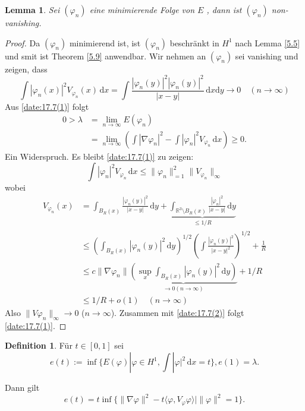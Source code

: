\documentclass[
paper=a4,
bibtotocnumbered,
liststotocnumbered,
tablecaptionabove,
pointlessnumbers,
twoside,
openright,
10pt
]
{report}
\let\phi\varphi
\newtheorem{lem}[thm]{Lemma}
\theoremstyle{definition}
\newtheorem*{df}{Definition}
\numberwithin{equation}{chapter}
\begin{document}
\begin{lem}\label{5.10}
Sei $(\phi_n)$ eine minimierende Folge von $E$ , dann ist $(\phi_n)$ non-vanishing.
\end{lem}
\begin{proof}
Da $(\phi_n)$ minimierend ist, ist $(\phi_n)$ beschränkt in $H^1$ nach Lemma \ref{5.5} und smit ist Theorem \ref{5.9} anwendbar. Wir nehmen an $(\phi_n)$ sei vanishing und zeigen, dass 
\begin{equation}\label{date:17.7(1)}
\int |\phi_n(x)|^2 V_{\phi_n} (x) \,\mathrm dx = \int \frac{|\phi_n(y)|^2 |\phi_n(y)|^2}{|x-y|}\, \mathrm dx \mathrm dy \to 0 \quad (n\to \infty)
\end{equation}
Aus \eqref{date:17.7(1)} folgt
\begin{align*}
0 >\lambda &= \lim_{n\to \infty} E(\phi_n)\\
&= \lim_{n\to \infty} ( \int |\nabla \phi_n|^2 - \int |\phi_n|^2 V_{\phi_n} \, \mathrm dx) \ge 0.
\end{align*}
Ein Widerspruch. Es bleibt \eqref{date:17.7(1)} zu zeigen:
\begin{equation}\label{date:17.7(2)}
\int |\phi_n|^2 V_{\phi_n} \, \mathrm dx \le \| \phi_n\|^2_{=1} \| V_{\phi_n} \|_\infty
\end{equation}
wobei
\begin{align}
V_{\phi_n} (x) &= \int_{B _R(x)} \frac{|\phi_n(y)|^2}{|x-y|}\, \mathrm dy +\underbrace{\int_{\mathbb R^3\setminus B_R(x)}\frac{|\phi_n|^2}{|x-y|} \, \mathrm dy}_{\le 1/R}\\
&\le \left (\int_{B_R(x)} |\phi_n(y)|^2 \, \mathrm dy \right )^{1/2} \left ( \int \frac{|\phi_n(y)|^2}{|x-y|^2} \right )^{1/2} + \frac{1}{R}\\
&\le c \| \nabla \phi_n\| \underbrace{\left ( \sup_x \int_{B_R(x)} |\phi_n(y)|^2\, \mathrm dy \right )}_{\to 0 (n\to \infty)} + 1/R\\
&\le 1/R + o(1) \quad (n\to \infty)
\end{align}
Also $\| V\phi_n \|_\infty \to 0$ ($n\to \infty$).  Zusammen mit \eqref{date:17.7(2)} folgt \eqref{date:17.7(1)}.
\end{proof}
\begin{df}
Für $t\in [0,1]$ sei
\begin{equation}\label{date:17.7(**)}
e(t):= \inf\{E(\phi) |\phi \in H^1, \int |\phi|^2\, \mathrm dx =t\}, e(1) = \lambda.
\end{equation}
\end{df}
Dann gilt $$e(t) = t \inf\{ \| \nabla \phi\|^2- t\langle \phi, V_\phi \phi\rangle |\| \phi\|^2 =1\}.$$
\end{document}
